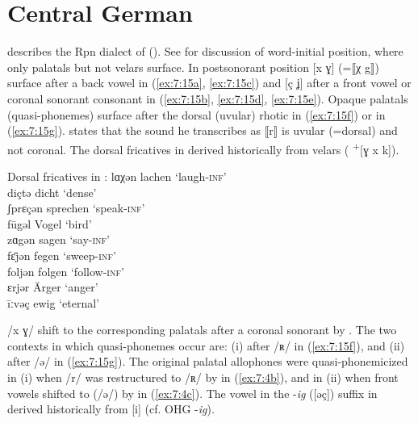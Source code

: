 \section{{Central} {German}}\label{sec:7.3}

\citet{Hasenclever1905} describes the Rpn dialect of  (). See  for discussion of word-initial position, where only palatals but not velars surface. In postsonorant position [x ɣ] (=⟦χ g⟧) surface after a back vowel in (\ref{ex:7:15a}, \ref{ex:7:15c}) and [ç ʝ] after a front vowel or coronal sonorant consonant in (\ref{ex:7:15b}, \ref{ex:7:15d}, \ref{ex:7:15e}). Opaque palatals (quasi-phonemes) surface after the dorsal (uvular) rhotic in (\ref{ex:7:15f}) or  in (\ref{ex:7:15g}). \citet[10]{Hasenclever1905} states that the sound he transcribes as ⟦r⟧ is uvular (=dorsal) and not coronal.  The dorsal fricatives in  derived historically from velars ( \textsuperscript{+}[ɣ x k]).

\ea%
\label{ex:7:15}Dorsal fricatives in :
\ea\label{ex:7:15a} lɑχən \tab [lɑxən] \tab lachen \tab ‘laugh\textsc{{}-inf}’ \\
\ex\label{ex:7:15b} diçtə \tab [diçtə] \tab dicht \tab ‘dense’ \\
ʃprɛçən \tab [ʃprɛçən] \tab sprechen \tab ‘speak\textsc{{}-inf}’ \\
\ex\label{ex:7:15c} fūgəl \tab [fuːɣǝl] \tab Vogel \tab ‘bird’ \\
zɑgən \tab [zɑɣǝn] \tab sagen \tab ‘say-\textsc{inf}’ \\
\ex\label{ex:7:15d} fɛ̄jən \tab [fɛːʝən] \tab fegen \tab ‘sweep-\textsc{inf}’ \\
\ex\label{ex:7:15e} foljən \tab [fɔlʝən] \tab folgen \tab ‘follow-\textsc{inf}’ \\
\ex\label{ex:7:15f} ɛrjər \tab [ɛʀʝər] \tab Ärger \tab ‘anger’ \\
\ex\label{ex:7:15g} īːvəç \tab [iːvəç] \tab ewig \tab ‘eternal’ \\
\z
\z 

 /x ɣ/ shift to the corresponding palatals after a coronal sonorant by . The two contexts in which quasi-phonemes occur are: (i) after /ʀ/ in (\ref{ex:7:15f}), and (ii) after /ə/ in (\ref{ex:7:15g}). The original palatal allophones were quasi-phonemicized in (i) when /r/ was restructured to /ʀ/ by  in (\ref{ex:7:4b}), and in (ii) when front vowels shifted to  (/ə/) by  in (\ref{ex:7:4c}). The vowel in the -\textit{ig} ([əç]) suffix in  derived historically from [i] (cf. OHG -\textit{ig}).

